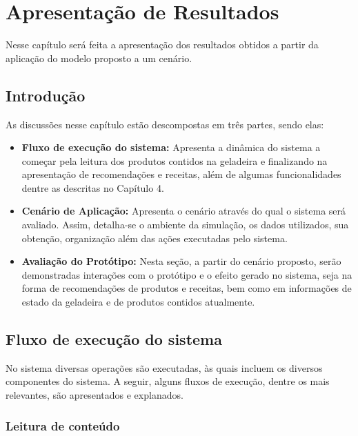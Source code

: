 \chapter{Apresentação de Resultados}
\label{cap:avaliacao_sistema}

Nesse capítulo será feita a apresentação dos resultados obtidos a partir da aplicação do modelo proposto a um cenário.

\section{Introdução}

As discussões nesse capítulo estão descompostas em três partes, sendo elas:

\begin{itemize} \parskip -4pt
    \item \textbf{Fluxo de execução do sistema:} Apresenta a dinâmica do sistema a começar pela leitura dos produtos contidos na geladeira e finalizando na apresentação de recomendações e receitas, além de algumas funcionalidades dentre as descritas no Capítulo 4.
    \item \textbf{Cenário de Aplicação:} Apresenta o cenário através do qual o sistema será avaliado. Assim, detalha-se o ambiente da simulação, os dados utilizados, sua obtenção, organização além das ações executadas pelo sistema.
    \item \textbf{Avaliação do Protótipo:} Nesta seção, a partir do cenário proposto, serão demonstradas interações com o protótipo e o efeito gerado no sistema, seja na forma de recomendações de produtos e receitas, bem como em informações de estado da geladeira e de produtos contidos atualmente.
\end{itemize}

\section{Fluxo de execução do sistema}

No sistema diversas operações são executadas, às quais incluem os diversos componentes do sistema. A seguir, alguns fluxos de execução, dentre os mais relevantes, são apresentados e explanados.

\subsection{Leitura de conteúdo}

